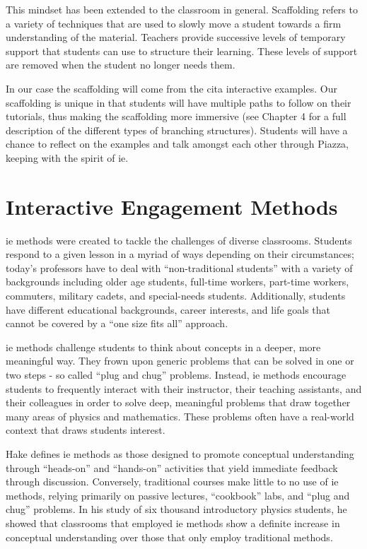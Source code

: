 This mindset has been extended to the classroom in general. Scaffolding refers to a variety of techniques that are used to slowly move a student towards a firm understanding of the material. Teachers provide successive levels of temporary support that students can use to structure their learning. These levels of support are removed when the student no longer needs them.

In our case the scaffolding will come from the \gls{cita} interactive examples. Our scaffolding is unique in that students will have multiple paths to follow on their tutorials, thus making the scaffolding more immersive (see Chapter 4 for a full description of the different types of branching structures). Students will have a chance to reflect on the examples and talk amongst each other through Piazza, keeping with the spirit of \gls{ie}.

\section{Interactive Engagement Methods}

\gls{ie} methods were created to tackle the challenges of diverse classrooms. Students respond to a given lesson in a myriad of ways depending on their circumstances; today's professors have to deal with ``non-traditional students'' with a variety of backgrounds including older age students, full-time workers, part-time workers, commuters, military cadets, and special-needs students. Additionally, students have different educational backgrounds, career interests, and life goals that cannot be covered by a ``one size fits all'' approach\cite{choy2002, horn1996, novak1999}.

\gls{ie} methods challenge students to think about concepts in a deeper, more meaningful way. They frown upon generic problems that can be solved in one or two steps - so called ``plug and chug'' problems. Instead, \gls{ie} methods encourage students to frequently interact with their instructor, their teaching assistants, and their colleagues in order to solve deep, meaningful problems that draw together many areas of physics and mathematics. These problems often have a real-world context that draws students interest.

Hake defines \gls{ie} methods as those designed to promote conceptual understanding through ``heads-on'' and ``hands-on'' activities that yield immediate feedback through discussion. Conversely, traditional courses make little to no use of \gls{ie} methods, relying primarily on passive lectures, ``cookbook'' labs, and ``plug and chug'' problems\cite{hake1998}. In his study of six thousand introductory physics students, he showed that classrooms that employed \gls{ie} methods show a definite increase in conceptual understanding over those that only employ traditional methods.

